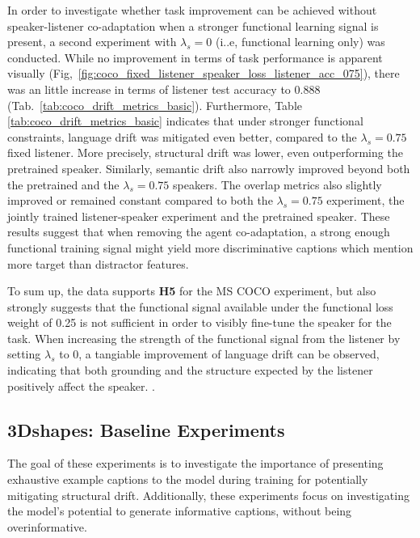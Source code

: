 In order to investigate whether task improvement can be achieved without speaker-listener co-adaptation when a stronger functional learning signal is present, a second experiment with $\lambda_s=0$ (i..e, functional learning only) was conducted. While no improvement in terms of task performance is apparent visually (Fig,~\ref{fig:coco_fixed_listener_speaker_loss_listener_acc_075}), there was an little increase in terms of listener test accuracy to 0.888 (Tab.~\ref{tab:coco_drift_metrics_basic}). Furthermore, Table \ref{tab:coco_drift_metrics_basic} indicates that under stronger functional constraints, language drift was mitigated even better, compared to the $\lambda_s = 0.75$ fixed listener. More precisely, structural drift was lower, even outperforming the pretrained speaker. Similarly, semantic drift also narrowly improved beyond both the pretrained and the $\lambda_s = 0.75$ speakers. 
The overlap metrics also slightly improved or remained constant compared to both the $\lambda_s=0.75$ experiment, the jointly trained listener-speaker experiment and the pretrained speaker. These results suggest that when removing the agent co-adaptation, a strong enough functional training signal might yield more discriminative captions which mention more target than distractor features. 

To sum up, the data supports \textbf{H5} for the MS COCO experiment, but also strongly suggests that the functional signal available under the functional loss weight of 0.25 is not sufficient in order to visibly fine-tune the speaker for the task. When increasing the strength of the functional signal from the listener by setting $\lambda_s$ to 0, a tangiable improvement of language drift can be observed, indicating that both grounding and the structure expected by the listener positively affect the speaker. .

\subsection{3Dshapes: Baseline Experiments}
\label{expt:3dshapes_baseline}

The goal of these experiments is to investigate the importance of presenting exhaustive example captions to the model during training for potentially mitigating structural drift. Additionally, these experiments focus on investigating the model's potential to generate informative captions, without being overinformative. 

